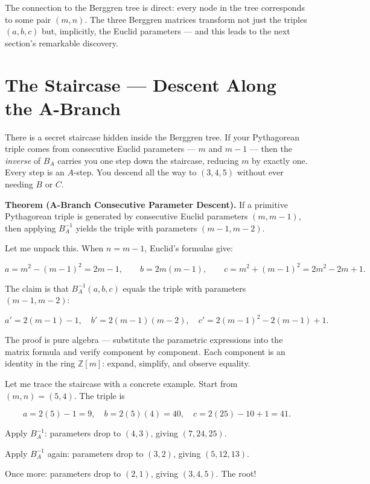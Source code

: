 The connection to the Berggren tree is direct: every node in the tree corresponds to some pair $(m, n)$. The three Berggren matrices transform not just the triples $(a, b, c)$ but, implicitly, the Euclid parameters --- and this leads to the next section's remarkable discovery.


\ornbreak



\section{The Staircase --- Descent Along the A-Branch}


There is a secret staircase hidden inside the Berggren tree. If your Pythagorean triple comes from consecutive Euclid parameters --- $m$ and $m - 1$ --- then the \textit{inverse} of $B_A$ carries you one step down the staircase, reducing $m$ by exactly one. Every step is an $A$-step. You descend all the way to $(3, 4, 5)$ without ever needing $B$ or $C$.

\textbf{Theorem (A-Branch Consecutive Parameter Descent).} If a primitive Pythagorean triple is generated by consecutive Euclid parameters $(m, m - 1)$, then applying $B_A^{-1}$ yields the triple with parameters $(m - 1, m - 2)$.

Let me unpack this. When $n = m - 1$, Euclid's formulas give:

\[
a = m^2 - (m-1)^2 = 2m - 1, \qquad b = 2m(m-1), \qquad c = m^2 + (m-1)^2 = 2m^2 - 2m + 1.
\]

The claim is that $B_A^{-1}(a, b, c)$ equals the triple with parameters $(m - 1, m - 2)$:

\[
a' = 2(m-1) - 1, \quad b' = 2(m-1)(m-2), \quad c' = 2(m-1)^2 - 2(m-1) + 1.
\]

The proof is pure algebra --- substitute the parametric expressions into the matrix formula and verify component by component. Each component is an identity in the ring $\mathbb{Z}[m]$: expand, simplify, and observe equality.

Let me trace the staircase with a concrete example. Start from $(m, n) = (5, 4)$. The triple is

\[
a = 2(5) - 1 = 9, \quad b = 2(5)(4) = 40, \quad c = 2(25) - 10 + 1 = 41.
\]

Apply $B_A^{-1}$: parameters drop to $(4, 3)$, giving $(7, 24, 25)$.

Apply $B_A^{-1}$ again: parameters drop to $(3, 2)$, giving $(5, 12, 13)$.

Once more: parameters drop to $(2, 1)$, giving $(3, 4, 5)$. The root!

